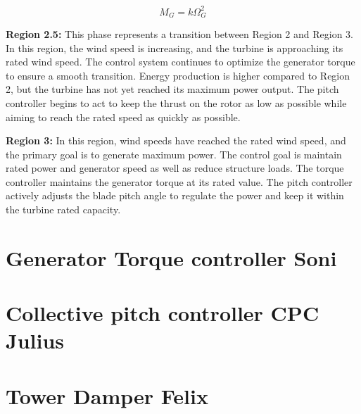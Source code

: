 \begin{equation}
	M_{G} = k\Omega_{G}^2
\end{equation}

\textbf{Region 2.5:} This phase represents a transition between Region 2 and Region 3. In this region, the wind speed is increasing, and the turbine is approaching its rated wind speed. The control system continues to optimize the generator torque to ensure a smooth transition. Energy production is higher compared to Region 2, but the turbine has not yet reached its maximum power output. The pitch controller begins to act to keep the thrust on the rotor as low as possible while aiming to reach the rated speed as quickly as possible.


\textbf{Region 3:} In this region, wind speeds have reached the rated wind speed, and the primary goal is to generate maximum power. The control goal is maintain rated power and generator speed as well as reduce structure loads. The torque controller maintains the generator torque at its rated value. The pitch controller actively adjusts the blade pitch angle to regulate the power and keep it within the turbine rated capacity.

\section{Generator Torque controller Soni}

\section{Collective pitch controller CPC Julius}

\section{Tower Damper Felix}
